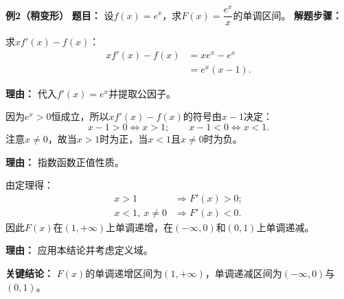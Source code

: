 \begin{examplebox}
	\medskip
	\textbf{\textcolor{CExample}{例2（稍变形）}}
	\textbf{\textcolor{CExample}{题目：}}
	设$f(x)=e^{x}$，求$F(x)=\dfrac{e^{x}}{x}$的单调区间。
	\textbf{\textcolor{CExample}{解题步骤：}}
	\begin{description}[style=nextline, leftmargin=2.8em, labelsep=0.5em, itemsep=0.45em]
		\item[\textbf{第一步（计算条件）：}]
			求$x f'(x)-f(x)$：
			\[
				\begin{aligned}
					x f'(x)-f(x) &= x e^{x} - e^{x} \\ &= e^{x}(x-1).
			\end{aligned}
			\]
			\par\textbf{理由：} 代入$f'(x)=e^{x}$并提取公因子。
		\item[\textbf{第二步（符号区间）：}]
			因为$e^{x}>0$恒成立，所以$x f'(x)-f(x)$的符号由$x-1$决定：
			\[
				x-1>0\iff x>1;\qquad x-1<0\iff x<1.
			\]
			注意$x\neq0$，故当$x>1$时为正，当$x<1$且$x\neq0$时为负。
			\par\textbf{理由：} 指数函数正值性质。
		\item[\textbf{第三步（单调结论）：}]
			由定理得：
			\[
				\begin{aligned}
					x>1 &\Rightarrow F'(x)>0; \\ x<1,\ x\neq0 &\Rightarrow F'(x)<0.
			\end{aligned}
			\]
			因此$F(x)$在$(1,+\infty)$上单调递增，在$(-\infty,0)$和$(0,1)$上单调递减。
			\par\textbf{理由：} 应用本结论并考虑定义域。
	\end{description}
	\textbf{\textcolor{CExample}{关键结论：}}
	$F(x)$的单调递增区间为$(1,+\infty)$，单调递减区间为$(-\infty,0)$与$(0,1)$。


\end{examplebox}
